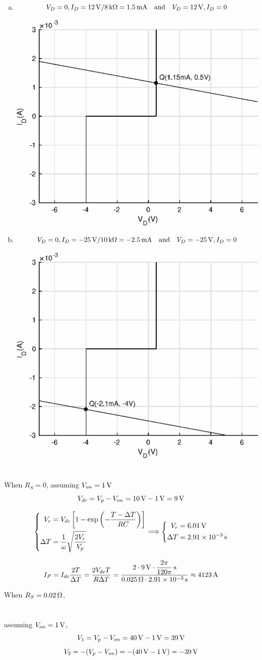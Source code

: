 \documentclass{article}
\newcommand{\unit}[1]{{\rm\,#1}}
\begin{document}
\begin{enumerate}[(a)]
\begin{center}
\end{center}
\item
$$V_D=0,I_D=12\unit{V}/8\unit{k\Omega}=1.5\unit{mA}{\rm\quad and\quad}V_D=12\unit{V},I_D=0$$
\begin{center}
\includegraphics[width=0.5\linewidth]{matlab/iv-7.eps}
\end{center}
\item
$$V_D=0,I_D=-25\unit{V}/10\unit{k\Omega}=-2.5\unit{mA}{\rm\quad and\quad}V_D=-25\unit{V},I_D=0$$
\begin{center}
\includegraphics[width=0.5\linewidth]{matlab/iv-8.eps}
\end{center}
\end{enumerate}

\section{}
When $R_S=0$, assuming $V_{on}=1\unit{V}$
$$V_{dc}=V_p-V_{on}=10\unit{V}-1\unit{V}=9\unit{V}$$

$$\left\{\begin{aligned}
V_r&=V_{dc}\left[1-\exp\left(-\frac{T-\Delta T}{RC}\right)\right]\\
\Delta T&=\frac{1}{\omega}\sqrt{\frac{2V_r}{V_p}}
\end{aligned}\right.\Longrightarrow\left\{\begin{aligned}
V_r&=6.01\unit{V}\\
\Delta T&=2.91\times10^{-3}\unit{s}
\end{aligned}\right.$$

$$I_P=I_{dc}\frac{2T}{\Delta T}=\frac{2V_{dc}T}{R\Delta T}=\frac{2\cdot9\unit{V}\cdot\dfrac{2\pi}{120\pi}\unit{s}}{0.025\unit{\Omega}\cdot2.91\times10^{-3}\unit{s}}\approx4123\unit{A}$$

When $R_S=0.02\unit{\Omega}$,

\section{}
assuming $V_{on}=1\unit{V}$,
$$V_1=V_p-V_{on}=40\unit{V}-1\unit{V}=39\unit{V}$$
$$V_2=-(V_p-V_{on})=-(40\unit{V}-1\unit{V})=-39\unit{V}$$
\end{document}
